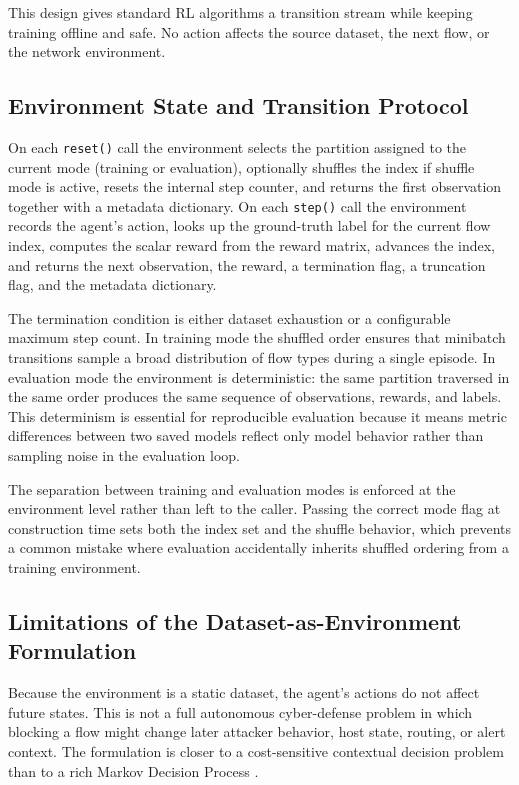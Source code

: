 This design gives standard RL algorithms a transition stream while keeping training offline and safe. No action affects the source dataset, the next flow, or the network environment.

\subsection{Environment State and Transition Protocol}
On each \texttt{reset()} call the environment selects the partition assigned to the current mode (training or evaluation), optionally shuffles the index if shuffle mode is active, resets the internal step counter, and returns the first observation together with a metadata dictionary. On each \texttt{step()} call the environment records the agent's action, looks up the ground-truth label for the current flow index, computes the scalar reward from the reward matrix, advances the index, and returns the next observation, the reward, a termination flag, a truncation flag, and the metadata dictionary.

The termination condition is either dataset exhaustion or a configurable maximum step count. In training mode the shuffled order ensures that minibatch transitions sample a broad distribution of flow types during a single episode. In evaluation mode the environment is deterministic: the same partition traversed in the same order produces the same sequence of observations, rewards, and labels. This determinism is essential for reproducible evaluation because it means metric differences between two saved models reflect only model behavior rather than sampling noise in the evaluation loop.

The separation between training and evaluation modes is enforced at the environment level rather than left to the caller. Passing the correct mode flag at construction time sets both the index set and the shuffle behavior, which prevents a common mistake where evaluation accidentally inherits shuffled ordering from a training environment.

\subsection{Limitations of the Dataset-as-Environment Formulation}
Because the environment is a static dataset, the agent's actions do not affect future states. This is not a full autonomous cyber-defense problem in which blocking a flow might change later attacker behavior, host state, routing, or alert context. The formulation is closer to a cost-sensitive contextual decision problem than to a rich Markov Decision Process \parencite{SuttonBarto2018RL,Levine2020OfflineRL}.

